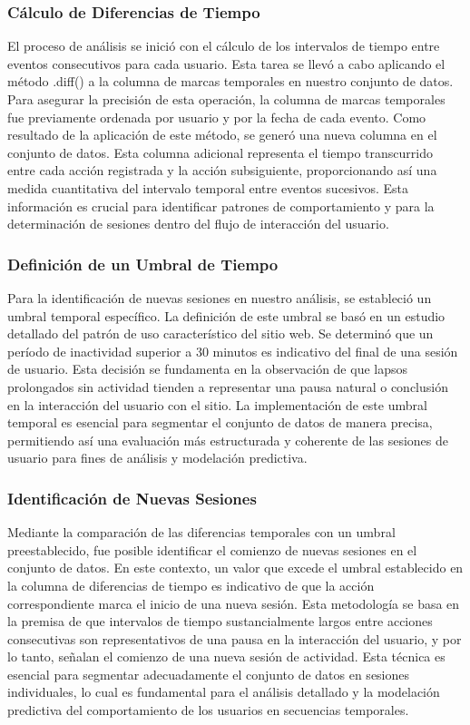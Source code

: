 \subsubsection{Cálculo de Diferencias de Tiempo} 
El proceso de análisis se inició con el cálculo de los intervalos de tiempo entre eventos consecutivos para cada usuario. Esta tarea se llevó a cabo aplicando el método .diff() a la columna de marcas temporales en nuestro conjunto de datos. Para asegurar la precisión de esta operación, la columna de marcas temporales fue previamente ordenada por usuario y por la fecha de cada evento. Como resultado de la aplicación de este método, se generó una nueva columna en el conjunto de datos. Esta columna adicional representa el tiempo transcurrido entre cada acción registrada y la acción subsiguiente, proporcionando así una medida cuantitativa del intervalo temporal entre eventos sucesivos. Esta información es crucial para identificar patrones de comportamiento y para la determinación de sesiones dentro del flujo de interacción del usuario.

\subsubsection{Definición de un Umbral de Tiempo} 
Para la identificación de nuevas sesiones en nuestro análisis, se estableció un umbral temporal específico. La definición de este umbral se basó en un estudio detallado del patrón de uso característico del sitio web. Se determinó que un período de inactividad superior a 30 minutos es indicativo del final de una sesión de usuario. Esta decisión se fundamenta en la observación de que lapsos prolongados sin actividad tienden a representar una pausa natural o conclusión en la interacción del usuario con el sitio. La implementación de este umbral temporal es esencial para segmentar el conjunto de datos de manera precisa, permitiendo así una evaluación más estructurada y coherente de las sesiones de usuario para fines de análisis y modelación predictiva.

\subsubsection{Identificación de Nuevas Sesiones}
Mediante la comparación de las diferencias temporales con un umbral preestablecido, fue posible identificar el comienzo de nuevas sesiones en el conjunto de datos. En este contexto, un valor que excede el umbral establecido en la columna de diferencias de tiempo es indicativo de que la acción correspondiente marca el inicio de una nueva sesión. Esta metodología se basa en la premisa de que intervalos de tiempo sustancialmente largos entre acciones consecutivas son representativos de una pausa en la interacción del usuario, y por lo tanto, señalan el comienzo de una nueva sesión de actividad. Esta técnica es esencial para segmentar adecuadamente el conjunto de datos en sesiones individuales, lo cual es fundamental para el análisis detallado y la modelación predictiva del comportamiento de los usuarios en secuencias temporales.

